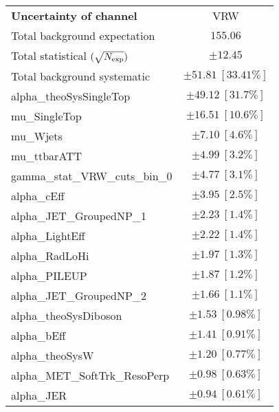 
\begin{table}
\begin{center}
\setlength{\tabcolsep}{0.0pc}
\begin{tabular*}{\textwidth}{@{\extracolsep{\fill}}lc}
\noalign{\smallskip}\hline\noalign{\smallskip}
{\bf Uncertainty of channel}                                    & VRW            \\
\noalign{\smallskip}\hline\noalign{\smallskip}
Total background expectation             &  $155.06$       \\
\noalign{\smallskip}\hline\noalign{\smallskip}
Total statistical $(\sqrt{N_{\rm exp}})$              & $\pm 12.45$       \\
Total background systematic               & $\pm 51.81\ [33.41\%] $             \\
\noalign{\smallskip}\hline\noalign{\smallskip}
\noalign{\smallskip}\hline\noalign{\smallskip}
alpha\_theoSysSingleTop         & $\pm 49.12\ [31.7\%] $       \\
mu\_SingleTop         & $\pm 16.51\ [10.6\%] $       \\
mu\_Wjets         & $\pm 7.10\ [4.6\%] $       \\
mu\_ttbarATT         & $\pm 4.99\ [3.2\%] $       \\
gamma\_stat\_VRW\_cuts\_bin\_0         & $\pm 4.77\ [3.1\%] $       \\
alpha\_cEff         & $\pm 3.95\ [2.5\%] $       \\
alpha\_JET\_GroupedNP\_1         & $\pm 2.23\ [1.4\%] $       \\
alpha\_LightEff         & $\pm 2.22\ [1.4\%] $       \\
alpha\_RadLoHi         & $\pm 1.97\ [1.3\%] $       \\
alpha\_PILEUP         & $\pm 1.87\ [1.2\%] $       \\
alpha\_JET\_GroupedNP\_2         & $\pm 1.66\ [1.1\%] $       \\
alpha\_theoSysDiboson         & $\pm 1.53\ [0.98\%] $       \\
alpha\_bEff         & $\pm 1.41\ [0.91\%] $       \\
alpha\_theoSysW         & $\pm 1.20\ [0.77\%] $       \\
alpha\_MET\_SoftTrk\_ResoPerp         & $\pm 0.98\ [0.63\%] $       \\
alpha\_JER         & $\pm 0.94\ [0.61\%] $       \\

\end{tabular*}
\end{center}
\end{table}
